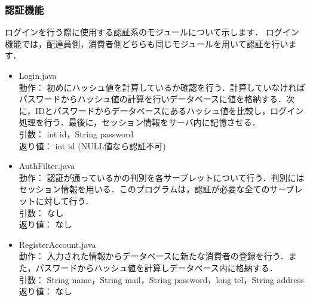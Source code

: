 \documentclass[a4j,titlepage]{jarticle}
\begin{document}
\subsubsection{認証機能}
ログインを行う際に使用する認証系のモジュールについて示します．
ログイン機能では，配達員側，消費者側どちらも同じモジュールを用いて認証を行います．
\begin{itemize}
\item Login.java\\
  動作： 初めにハッシュ値を計算しているか確認を行う．計算していなければパスワードからハッシュ値の計算を行いデータベースに値を格納する．次に，IDとパスワードからデータベースにあるハッシュ値を比較し，ログイン処理を行う．最後に，セッション情報をサーバ内に記憶させる．\\
  引数： int id，String password\\
  返り値： int id (NULL値なら認証不可)
\item AuthFilter.java\\
  動作： 認証が通っているかの判別を各サーブレットについて行う．判別にはセッション情報を用いる．このプログラムは，認証が必要な全てのサーブレットに対して行う．\\
  引数： なし\\
  返り値： なし
\item RegisterAccount.java\\
  動作： 入力された情報からデータベースに新たな消費者の登録を行う．また，パスワードからハッシュ値を計算しデータベース内に格納する．\\
  引数： String name，String mail，String password，long tel，String address\\
  返り値： なし
\end{itemize}
\end{document}
